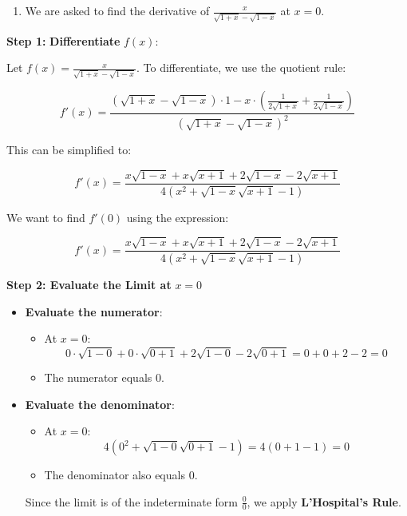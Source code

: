 \documentclass[
]{book}
\providecommand{\tightlist}{%
  \setlength{\itemsep}{0pt}\setlength{\parskip}{0pt}}
\theoremstyle{definition}
\theoremstyle{definition}
\theoremstyle{definition}
\theoremstyle{definition}
\theoremstyle{remark}
\begin{document}
\begin{enumerate}
\def\labelenumi{\arabic{enumi}.}
\setcounter{enumi}{5}
\tightlist
\item
  We are asked to find the derivative of \(\frac{x}{\sqrt{1+x} - \sqrt{1-x}}\) at \(x = 0\).
\end{enumerate}

\textbf{Step 1:} \textbf{Differentiate} \(f(x)\):

Let \(f(x) = \frac{x}{\sqrt{1+x} - \sqrt{1-x}}\). To differentiate, we use the quotient rule:

\[
f'(x) = \frac{(\sqrt{1+x} - \sqrt{1-x}) \cdot 1 - x \cdot \left( \frac{1}{2\sqrt{1+x}} + \frac{1}{2\sqrt{1-x}} \right)}{(\sqrt{1+x} - \sqrt{1-x})^2}
\]

This can be simplified to:

\[
f'(x) = \frac{x \sqrt{1 - x} + x \sqrt{x + 1} + 2 \sqrt{1 - x} - 2 \sqrt{x + 1}}{4 \left( x^2 + \sqrt{1 - x} \sqrt{x + 1} - 1 \right)}
\]

We want to find \(f'(0)\) using the expression:

\[
f'(x) = \frac{x \sqrt{1 - x} + x \sqrt{x + 1} + 2 \sqrt{1 - x} - 2 \sqrt{x + 1}}{4 \left( x^2 + \sqrt{1 - x} \sqrt{x + 1} - 1 \right)}
\]

\textbf{Step 2: Evaluate the Limit at} \(x = 0\)

\begin{itemize}
\item
  \textbf{Evaluate the numerator}:

  \begin{itemize}
  \tightlist
  \item
    At \(x = 0\): \[
    0 \cdot \sqrt{1 - 0} + 0 \cdot \sqrt{0 + 1} + 2 \sqrt{1 - 0} - 2 \sqrt{0 + 1} = 0 + 0 + 2 - 2 = 0
    \]
  \item
    The numerator equals \(0\).
  \end{itemize}
\item
  \textbf{Evaluate the denominator}:

  \begin{itemize}
  \tightlist
  \item
    At \(x = 0\): \[
    4 \left( 0^2 + \sqrt{1 - 0} \sqrt{0 + 1} - 1 \right) = 4(0 + 1 - 1) = 0
    \]
  \item
    The denominator also equals \(0\).
  \end{itemize}

  Since the limit is of the indeterminate form \(\frac{0}{0}\), we apply \textbf{L'Hospital's Rule}.
\end{itemize}
\end{document}
